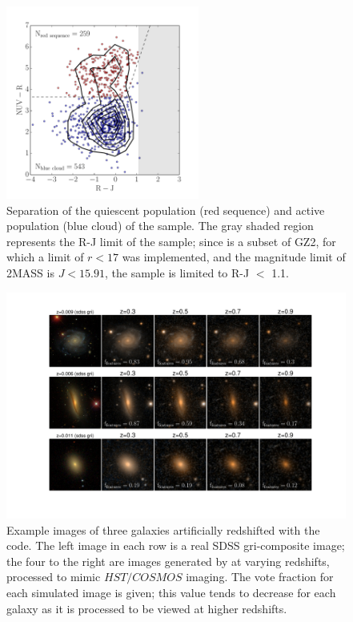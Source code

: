\documentclass[useAMS,usenatbib]{mn2e}
\begin{document}
\begin{figure}
\centering
\includegraphics[width=2.5in,height=2.5in,trim={.5cm 0cm .5cm 0cm},clip]{figures/ferengi2_colorcolor.pdf}
\caption{Separation of the quiescent population (red sequence) and active population (blue cloud) of the  sample. The gray shaded region represents the R-J limit of the sample; since  is a subset of GZ2, for which a limit of $r<17$ was implemented, and the magnitude limit of 2MASS is $J<15.91$, the  sample is limited to R-J $<$ 1.1.}
\label{fig:ferengi2colorcolor}
\end{figure}

\begin{figure}
\centering
\includegraphics[width=\textwidth,trim={.5cm 3cm .5cm .5cm},clip]{figures/ferengi2_examples_with_fractions.pdf}
\caption{Example images of three galaxies artificially redshifted with the \ferengi{} code. The left image in each row is a real SDSS gri-composite image; the four to the right are images generated by \ferengi{} at varying redshifts, processed to mimic $HST/COSMOS$ imaging. The \ffeatures{} vote fraction for each simulated image is given; this value tends to decrease for each galaxy as it is processed to be viewed at higher redshifts. }
\label{fig:ferengi2example}
\end{figure}
\end{document}
